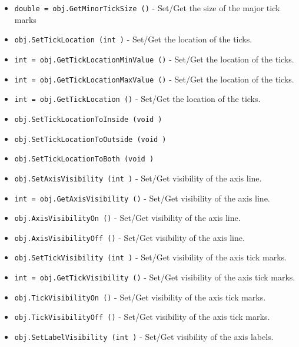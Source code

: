 \begin{itemize}
\item  \verb|double = obj.GetMinorTickSize ()| -  Set/Get the size of the major tick marks 

\item  \verb|obj.SetTickLocation (int )| -  Set/Get the location of the ticks.

\item  \verb|int = obj.GetTickLocationMinValue ()| -  Set/Get the location of the ticks.

\item  \verb|int = obj.GetTickLocationMaxValue ()| -  Set/Get the location of the ticks.

\item  \verb|int = obj.GetTickLocation ()| -  Set/Get the location of the ticks.

\item  \verb|obj.SetTickLocationToInside (void )|

\item  \verb|obj.SetTickLocationToOutside (void )|

\item  \verb|obj.SetTickLocationToBoth (void )|

\item  \verb|obj.SetAxisVisibility (int )| -  Set/Get visibility of the axis line.

\item  \verb|int = obj.GetAxisVisibility ()| -  Set/Get visibility of the axis line.

\item  \verb|obj.AxisVisibilityOn ()| -  Set/Get visibility of the axis line.

\item  \verb|obj.AxisVisibilityOff ()| -  Set/Get visibility of the axis line.

\item  \verb|obj.SetTickVisibility (int )| -  Set/Get visibility of the axis tick marks.

\item  \verb|int = obj.GetTickVisibility ()| -  Set/Get visibility of the axis tick marks.

\item  \verb|obj.TickVisibilityOn ()| -  Set/Get visibility of the axis tick marks.

\item  \verb|obj.TickVisibilityOff ()| -  Set/Get visibility of the axis tick marks.

\item  \verb|obj.SetLabelVisibility (int )| -  Set/Get visibility of the axis labels.


\end{itemize}
